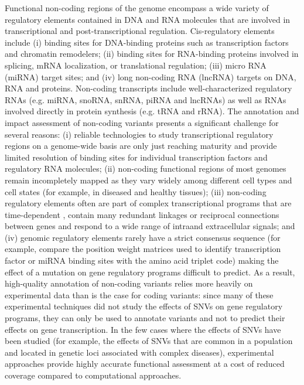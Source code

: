 Functional non-coding regions of the genome encompass a wide variety of regulatory elements contained in DNA and RNA molecules that are involved in transcriptional and post-transcriptional regulation. Cis-regulatory elements include (i) binding sites for DNA-binding proteins such as transcription factors and chromatin remodelers; (ii) binding sites for RNA-binding proteins involved in splicing, mRNA localization, or translational regulation; (iii) micro RNA (miRNA) target sites; and (iv) long non-coding RNA (lncRNA) targets on DNA, RNA and proteins. Non-coding transcripts include well-characterized regulatory RNAs (e.g. miRNA, snoRNA, snRNA, piRNA and lncRNAs) as well as RNAs involved directly in protein synthesis (e.g. tRNA and rRNA).  The annotation and impact assessment of non-coding variants presents a significant challenge for several reasons: (i) reliable technologies to study transcriptional regulatory regions on a genome-wide basis are only just reaching maturity and provide limited resolution of binding sites for individual transcription factors and regulatory RNA molecules; (ii) non-coding functional regions of most genomes remain incompletely mapped as they vary widely among different cell types and cell states (for example, in diseased and healthy tissues); (iii) non-coding regulatory elements often are part of complex transcriptional programs that are time-dependent \cite{mattick2001non}, contain many redundant linkages or reciprocal connections between genes and respond to a wide range of intraand extracellular signals; and (iv) genomic regulatory elements rarely have a strict consensus sequence (for example, compare the position weight matrices used to identify transcription factor or miRNA binding sites with the amino acid triplet code) making the effect of a mutation on gene regulatory programs difficult to predict. As a result, high-quality annotation of non-coding variants relies more heavily on experimental data than is the case for coding variants: since many of these experimental techniques did not study the effects of SNVs on gene regulatory programs, they can only be used to annotate variants and not to predict their effects on gene transcription. In the few cases where the effects of SNVs have been studied (for example, the effects of SNVs that are common in a population and located in genetic loci associated with complex diseases), experimental approaches provide highly accurate functional assessment at a cost of reduced coverage compared to computational approaches.

